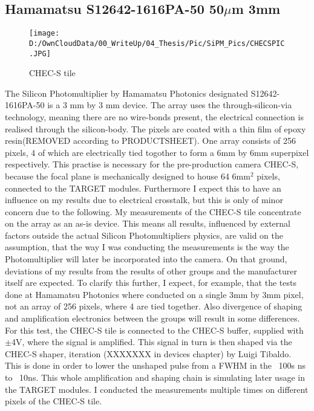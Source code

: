 \documentclass[article,type=msc,colorback,accentcolor=tud9c]{tudthesis}
\begin{document}
\subsection{Hamamatsu S12642-1616PA-50 50$\mu$m 3mm}
\begin{wrapfigure}{R}{0.3\textwidth}
\centering
\texttt{[image: D:/OwnCloudData/00\_WriteUp/04\_Thesis/Pic/SiPM\_Pics/CHECSPIC.JPG]}
\caption{\label{fig:CHECSTILE}CHEC-S tile}
\end{wrapfigure}
The Silicon Photomultiplier by Hamamatsu Photonics designated S12642-1616PA-50 is a 3 mm by 3 mm device. The array uses the through-silicon-via technology, meaning there are no wire-bonds present, the electrical connection is realised through the silicon-body. The pixels are coated with a thin film of epoxy resin(REMOVED according to PRODUCTSHEET). One array consists of 256 pixels, 4 of which are electrically tied togother to form a 6mm by 6mm superpixel respectively. This practise is necessary for the pre-production camera CHEC-S, because the focal plane is mechanically designed to house 64 6mm$^{2}$ pixels, connected to the TARGET modules. Furthermore I expect this to have an influence on my results due to electrical crosstalk, but this is only of minor concern due to the following. My measurements of the CHEC-S tile concentrate on the array as an as-is device. This means all results, influenced by external factors outside the actual Silicon Photomultipliers physics, are valid on the assumption, that the way I was conducting the measurements is the way the Photomultiplier will later be incorporated into the camera. On that ground, deviations of my results from the results of other groups and the manufacturer itself are expected. To clarify this further, I expect, for example, that the tests done at Hamamatsu Photonics where conducted on a single 3mm by 3mm pixel, not an array of 256 pixels, where 4 are tied together. Also divergence of shaping and amplification electronics between the groups will result in some differences. For this test, the CHEC-S tile is connected to the CHEC-S buffer, supplied with $\pm$4V, where the signal is amplified. This signal in turn is then shaped via the CHEC-S shaper, iteration (XXXXXXX in devices chapter) by Luigi Tibaldo. This is done in order to lower the unshaped pulse from a FWHM in the ~100s ns to ~10ns. This whole amplification and shaping chain is simulating later usage in the TARGET modules. I conducted the measurements multiple times on different pixels of the CHEC-S tile.
\end{document}

